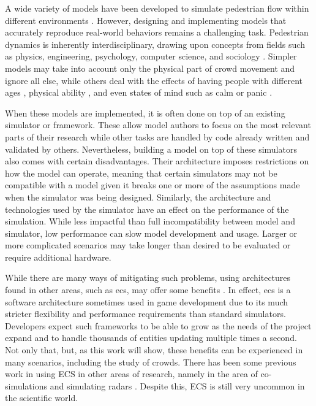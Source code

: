 \documentclass[twoside, 11pt]{article}
\begin{document}
A wide variety of models have been developed to simulate pedestrian flow within different environments \cite{kouskoulisSystematicReviewPedestrian2017}. However, designing and implementing models that accurately reproduce real-world behaviors remains a challenging task. Pedestrian dynamics is inherently interdisciplinary, drawing upon concepts from fields such as physics, engineering, psychology, computer science, and sociology \cite{kleinmeierVadereOpenSourceSimulation2019}. Simpler models may take into account only the physical part of crowd movement and ignore all else, while others deal with the effects of having people with different ages \cite{gorriniAgeGroupdrivenPedestrian2016}, physical ability \cite{fuExperimentalStudyBidirectional2022}, and even states of mind such as calm or panic \cite{Alrashed_Shamma_2020}.


When these models are implemented, it is often done on top of an existing simulator or framework. These allow model authors to focus on the most relevant parts of their research while other tasks are handled by code already written and validated by others. Nevertheless, building a model on top of these simulators also comes with certain disadvantages. Their architecture imposes restrictions on how the model can operate, meaning that certain simulators may not be compatible with a model given it breaks one or more of the assumptions made when the simulator was being designed. Similarly, the architecture and technologies used by the simulator have an effect on the performance of the simulation. While less impactful than full incompatibility between model and simulator, low performance can slow model development and usage. Larger or more complicated scenarios may take longer than desired to be evaluated or require additional hardware.

While there are many ways of mitigating such problems, using architectures found in other areas, such as \gls{ecs}, may offer some benefits \cite{ecs}. In effect, \gls{ecs} is a software architecture sometimes used in game development due to its much stricter flexibility and performance requirements than standard simulators. Developers expect such frameworks to be able to grow as the needs of the project expand and to handle thousands of entities updating multiple times a second. Not only that, but, as this work will show, these benefits can be experienced in many scenarios, including the study of crowds.  There has been some previous work in using ECS in other areas of research, namely in the area of co-simulations \cite{HATLEDAL2021102243} and simulating radars \cite{satelite}. Despite this, ECS is still very uncommon in the scientific world.
\end{document}
